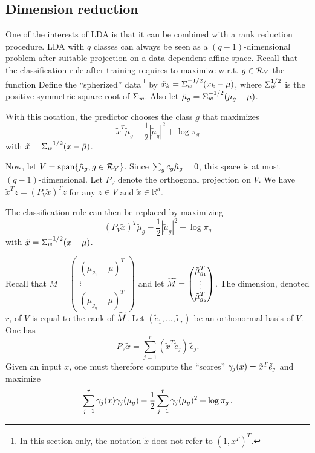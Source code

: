 \subsection{Dimension reduction}

One of the interests of LDA
is that it can be combined with a rank reduction procedure.
 LDA with $q$ classes can always be seen as a $(q-1)$-dimensional problem after suitable projection on a data-dependent affine space.
 Recall that the classification rule after training requires to maximize w.r.t. $g\in {\mathcal R}_Y$ the function
Define the ``spherized''  data\,\footnote{In this section only, the notation $\tilde  x$ does not refer to $(1,x^T)^T$.} by  $\tilde x_k = \Sigma_w^{-1/2}(x_k-\mu)$, where $\Sigma^{1/2}_w$ is the positive symmetric square root of $\Sigma_w$. 
Also let  $\tilde\mu_g =  \Sigma^{-1/2}_w (\mu_g - \mu)$. 
 
With this notation, the predictor chooses the class $g$ that maximizes 
\[
\tilde x^T \tilde \mu_g - \frac{1}{2} |\tilde \mu_g|^2 + \log \pi_g
\]
with $\tilde x = \Sigma_w^{-1/2}(x-\bar\mu)$.

Now, let $V = \mathrm{span}\{\tilde \mu_g, g\in
{\mathcal R}_Y\}$. 
 Since $\sum_g c_g{\tilde{\mu}}_g = 0$, this space is at most $(q-1)$-dimensional.
 Let $P_V$ denote the orthogonal projection on $V$. 
 We have
$\tilde x^T z = (P_V\tilde x)^T z$ for any $z\in V$ and $\tilde x\in \mathbb R^d$.

 The classification rule can then be replaced by maximizing
$$
(P_V \tilde x)^T \tilde \mu_g - \frac{1}{2} |\tilde \mu_g|^2 + \log \pi_g
$$
with $\tilde x = \Sigma_w^{-1/2}(x-\bar\mu)$.

Recall that  $M = \begin{pmatrix} (\mu_{g_1}-\mu)^T\\ \vdots\\ (\mu_{g_q}-\mu)^T\end{pmatrix}$ and let $\widetilde M = \begin{pmatrix} \tilde \mu^T_{g_1}\\ \vdots\\ \tilde \mu_{g_q}^T\end{pmatrix}$.
The dimension, denoted $r$, of $V$ is equal to the rank of $\widetilde M$.
Let $(\tilde e_1,
\ldots, \tilde e_{r})$ be an orthonormal basis of $V$.  One has
\[
P_V \tilde x = \sum_{j=1}^{r} (\tilde x^T\tilde e_j)\, \tilde e_j.
\]
 Given an input $x$, one must therefore compute the ``scores'' $\gamma_j(x) =
\tilde x^T \tilde e_j$ and maximize
\[
\sum_{j=1}^r\gamma_j(x)\gamma_j(\mu_g) - \frac{1}{2} \sum_{j=1}^r \gamma_j(\mu_g)^2 + \log \pi_g\,.
\]

